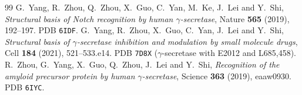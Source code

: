 \documentclass[11pt,reqno]{amsart}
\theoremstyle{plain}
\theoremstyle{definition}
\theoremstyle{remark}
\numberwithin{equation}{section}
\begin{document}
\begin{thebibliography}{99}
 G.~Yang, R.~Zhou, Q.~Zhou, X.~Guo, C.~Yan, M.~Ke, J.~Lei and Y.~Shi, \emph{Structural basis of Notch recognition by human $\gamma$-secretase}, Nature \textbf{565} (2019), 192--197. PDB \texttt{6IDF}.
 G.~Yang, R.~Zhou, X.~Guo, C.~Yan, J.~Lei and Y.~Shi, \emph{Structural basis of $\gamma$-secretase inhibition and modulation by small molecule drugs}, Cell \textbf{184} (2021), 521--533.e14. PDB \texttt{7D8X} ($\gamma$-secretase with E2012 and L685,458).
 R.~Zhou, G.~Yang, X.~Guo, Q.~Zhou, J.~Lei and Y.~Shi, \emph{Recognition of the amyloid precursor protein by human $\gamma$-secretase}, Science \textbf{363} (2019), eaaw0930. PDB \texttt{6IYC}.
\end{thebibliography}
\end{document}
